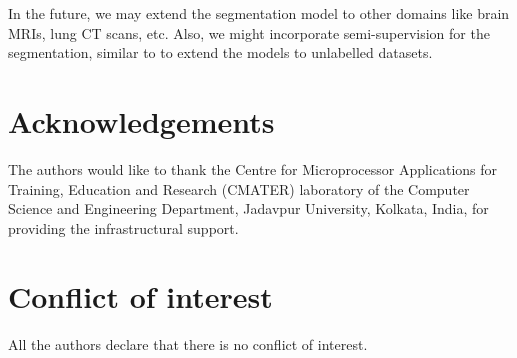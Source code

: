\documentclass[review]{elsarticle}
\begin{document}
In the future, we may extend the segmentation model to other domains like brain MRIs, lung CT scans, etc. Also, we might incorporate semi-supervision for the segmentation, similar to \cite{li2021single} to extend the models to unlabelled datasets.

\section*{Acknowledgements}
The authors would like to thank the Centre for Microprocessor Applications for Training, Education and Research (CMATER) laboratory of the Computer Science and Engineering Department, Jadavpur University, Kolkata, India, for providing the infrastructural support.

\section*{Conflict of interest}
All the authors declare that there is no conflict of interest.


\end{document}
